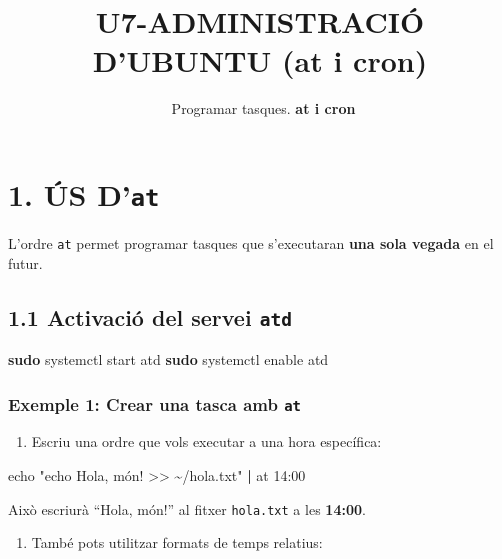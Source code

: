 \documentclass[
  12 pt,
  a4paper,
]{article}
\title{U7-ADMINISTRACIÓ D'UBUNTU (at i cron)}
\subtitle{~Programar tasques. \textbf{at i cron}}
\author{}
\date{\vspace{-2.5em}}
\newenvironment{Shaded}{\begin{snugshade}}{\end{snugshade}}
\newcommand{\BuiltInTok}[1]{#1}
\newcommand{\ExtensionTok}[1]{#1}
\newcommand{\FunctionTok}[1]{\textcolor[rgb]{0.13,0.29,0.53}{\textbf{#1}}}
\newcommand{\KeywordTok}[1]{\textcolor[rgb]{0.13,0.29,0.53}{\textbf{#1}}}
\newcommand{\NormalTok}[1]{#1}
\newcommand{\StringTok}[1]{\textcolor[rgb]{0.31,0.60,0.02}{#1}}
\providecommand{\tightlist}{%
  \setlength{\itemsep}{0pt}\setlength{\parskip}{0pt}}
\begin{document}
\maketitle

\section{\texorpdfstring{1. ÚS
D'\texttt{at}}{1. ÚS D'at}}\label{uxfas-dat}

L'ordre \texttt{at} permet programar tasques que s'executaran
\textbf{una sola vegada} en el futur.

\subsection{\texorpdfstring{1.1 Activació del servei
\texttt{atd}}{1.1 Activació del servei atd}}\label{activaciuxf3-del-servei-atd}

\begin{Shaded}
\begin{Highlighting}[]
\FunctionTok{sudo}\NormalTok{ systemctl start atd}
\FunctionTok{sudo}\NormalTok{ systemctl enable atd}
\end{Highlighting}
\end{Shaded}

\subsubsection{\texorpdfstring{Exemple 1: Crear una tasca amb
\texttt{at}}{Exemple 1: Crear una tasca amb at}}\label{exemple-1-crear-una-tasca-amb-at}

\begin{enumerate}
\def\labelenumi{\arabic{enumi}.}
\tightlist
\item
  Escriu una ordre que vols executar a una hora específica:
\end{enumerate}

\begin{Shaded}
\begin{Highlighting}[]
\BuiltInTok{echo} \StringTok{"echo \textquotesingle{}Hola, món!\textquotesingle{} \textgreater{}\textgreater{} \textasciitilde{}/hola.txt"} \KeywordTok{|} \ExtensionTok{at}\NormalTok{ 14:00}
\end{Highlighting}
\end{Shaded}

Això escriurà ``Hola, món!'' al fitxer \texttt{hola.txt} a les
\textbf{14:00}.

\begin{enumerate}
\def\labelenumi{\arabic{enumi}.}
\setcounter{enumi}{1}
\tightlist
\item
  També pots utilitzar formats de temps relatius:
\end{enumerate}
\end{document}
